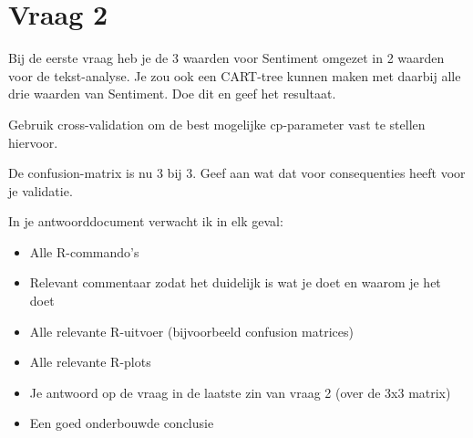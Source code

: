 \documentclass[
]{article}
\providecommand{\tightlist}{%
  \setlength{\itemsep}{0pt}\setlength{\parskip}{0pt}}
\begin{document}
\hypertarget{vraag-2}{%
\section{Vraag 2}\label{vraag-2}}

Bij de eerste vraag heb je de 3 waarden voor Sentiment omgezet in 2
waarden voor de tekst-analyse. Je zou ook een CART-tree kunnen maken met
daarbij alle drie waarden van Sentiment. Doe dit en geef het resultaat.

Gebruik cross-validation om de best mogelijke cp-parameter vast te
stellen hiervoor.

De confusion-matrix is nu 3 bij 3. Geef aan wat dat voor consequenties
heeft voor je validatie.

In je antwoorddocument verwacht ik in elk geval:

\begin{itemize}
\tightlist
\item
  Alle R-commando's
\item
  Relevant commentaar zodat het duidelijk is wat je doet en waarom je
  het doet
\item
  Alle relevante R-uitvoer (bijvoorbeeld confusion matrices)
\item
  Alle relevante R-plots
\item
  Je antwoord op de vraag in de laatste zin van vraag 2 (over de 3x3
  matrix)
\item
  Een goed onderbouwde conclusie
\end{itemize}
\end{document}
